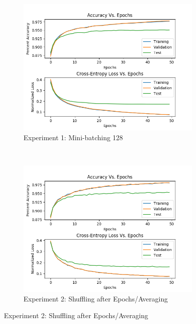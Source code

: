 \documentclass{article} %
\begin{document}
{{\begin{figure}[h!]
\captionsetup[subfigure]{labelformat=empty}
    \centering
    \begin{subfigure}[t]{0.5\textwidth}
        \centering
        \includegraphics[scale=0.48]{3e.png}
        \caption{Experiment 1: Mini-batching 128}
    \end{subfigure}%
    ~ 
    \begin{subfigure}[t]{0.5\textwidth}
        \centering
        \includegraphics[scale=0.48]{4a.png}
        \caption{Experiment 2: Shuffling after Epochs/Averaging}
    \end{subfigure}
\end{figure}


}}
\end{document}
